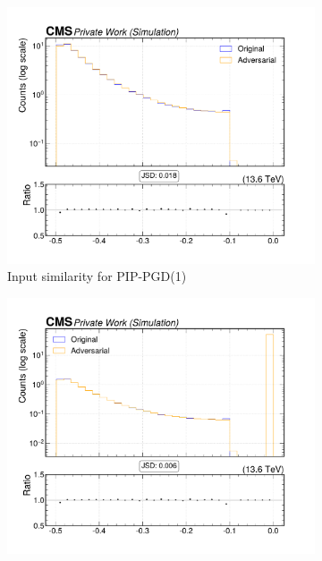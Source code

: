 \begin{figure}[htbp]
  \centering
  \begin{subfigure}[t]{0.32\textwidth}
    \includegraphics[width=\linewidth]{media/output/features/compare/combined_it_1/cmp_vtx_arr_sv_deltaR.pdf}
    \caption*{Input similarity for PIP-PGD(1)}
  \end{subfigure}\hfill
  \begin{subfigure}[t]{0.32\textwidth}
    \includegraphics[width=\linewidth]{media/output/features/compare/combined_it_2/cmp_vtx_arr_sv_deltaR.pdf}

\end{subfigure}
\end{figure}
